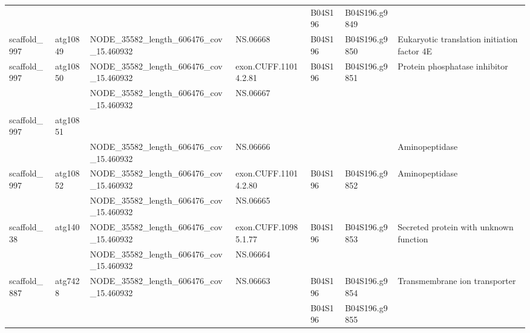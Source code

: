 \begin{longtable}{lllllll}
                &               &                                              &                       &      B04S196 &  B04S196.g9849 &                                                  \\
   scaffold\_997 &      atg10849 &  NODE\_35582\_length\_606476\_cov\_15.460932 &              NS.06668 &      B04S196 &  B04S196.g9850 &      Eukaryotic translation initiation factor 4E \\
   scaffold\_997 &      atg10850 &  NODE\_35582\_length\_606476\_cov\_15.460932 &  exon.CUFF.11014.2.81 &      B04S196 &  B04S196.g9851 &                    Protein phosphatase inhibitor \\
                &               &  NODE\_35582\_length\_606476\_cov\_15.460932 &              NS.06667 &              &                &                                                  \\
   scaffold\_997 &      atg10851 &                                             &                       &              &                &                                                  \\
                &               &  NODE\_35582\_length\_606476\_cov\_15.460932 &              NS.06666 &              &                &                                   Aminopeptidase \\
   scaffold\_997 &      atg10852 &  NODE\_35582\_length\_606476\_cov\_15.460932 &  exon.CUFF.11014.2.80 &      B04S196 &  B04S196.g9852 &                                   Aminopeptidase \\
                &               &  NODE\_35582\_length\_606476\_cov\_15.460932 &              NS.06665 &              &                &                                                  \\
    scaffold\_38 &        atg140 &  NODE\_35582\_length\_606476\_cov\_15.460932 &  exon.CUFF.10985.1.77 &      B04S196 &  B04S196.g9853 &           Secreted protein with unknown function \\
                &               &  NODE\_35582\_length\_606476\_cov\_15.460932 &              NS.06664 &              &                &                                                  \\
   scaffold\_887 &       atg7428 &  NODE\_35582\_length\_606476\_cov\_15.460932 &              NS.06663 &      B04S196 &  B04S196.g9854 &                    Transmembrane ion transporter \\
                &               &                                              &                       &      B04S196 &  B04S196.g9855 &                                                  \\

\end{longtable}
